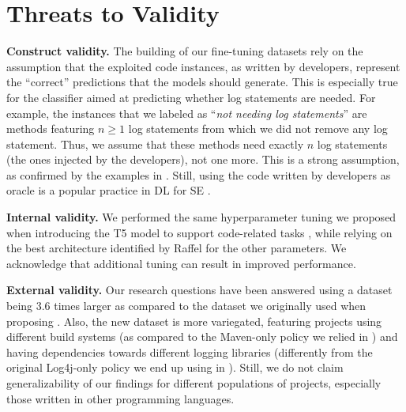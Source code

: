 \section{Threats to Validity} \label{sec:threats}

\textbf{Construct validity.} The building of our fine-tuning datasets rely on the assumption that the exploited code instances, as written by developers, represent the ``correct'' predictions that the models should generate. This is especially true for the classifier aimed at predicting whether log statements are needed. For example, the instances that we labeled as ``\emph{not needing log statements}'' are methods featuring $n \geq 1$ log statements from which we did not remove any log statement. Thus, we assume that these methods need exactly $n$ log statements (\ie the ones injected by the developers), not one more. This is a strong assumption, as confirmed by the examples in . Still, using the code written by developers as oracle is a popular practice in DL for SE \cite{tufano2022using, Tufano:tosem2019, tufano-mutants, watson2020learning, tufano2022generating}.


\textbf{Internal validity.}  We performed the same hyperparameter tuning we proposed when introducing the T5 model to support code-related tasks \cite{mastropaolo2021studying}, while relying on the best architecture identified by Raffel \etal \cite{raffel2019exploring} for the other parameters. We acknowledge that additional tuning can result in improved performance.


\textbf{External validity.} Our research questions have been answered using a dataset being 3.6 times larger as compared to the dataset we originally used when proposing \cite{mastropaolo2022using}. Also, the new dataset is more variegated, featuring projects using different build systems (as compared to the Maven-only policy we relied in \cite{mastropaolo2022using}) and having dependencies towards different logging libraries (differently from the original Log4j-only policy we end up using in \cite{mastropaolo2022using}). Still, we do not claim generalizability of our findings for different populations of projects, especially those written in other programming languages.